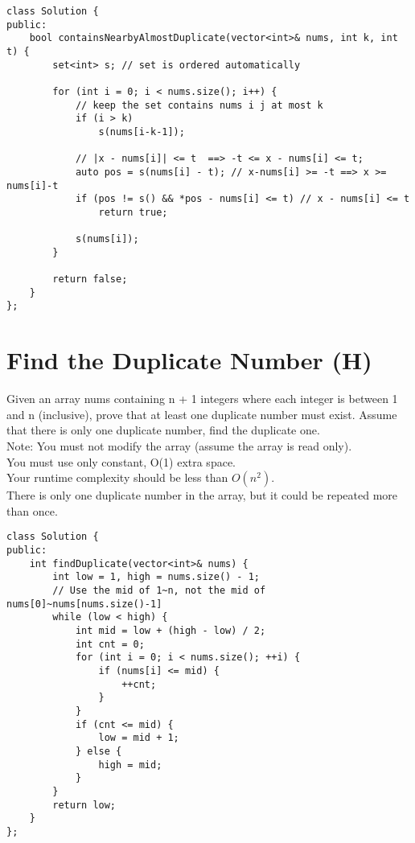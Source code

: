 \begin{lstlisting}
class Solution {
public:
    bool containsNearbyAlmostDuplicate(vector<int>& nums, int k, int t) {
        set<int> s; // set is ordered automatically 
        
        for (int i = 0; i < nums.size(); i++) {
            // keep the set contains nums i j at most k
            if (i > k) 
                s(nums[i-k-1]); 
            
            // |x - nums[i]| <= t  ==> -t <= x - nums[i] <= t;
            auto pos = s(nums[i] - t); // x-nums[i] >= -t ==> x >= nums[i]-t 
            if (pos != s() && *pos - nums[i] <= t) // x - nums[i] <= t
                return true;
            
            s(nums[i]);
        }
        
        return false;
    }
};
\end{lstlisting}


\section{Find the Duplicate Number (H)}
Given an array nums containing n + 1 integers where each integer is between 1 and n (inclusive), prove that at least one duplicate number must exist. Assume that there is only one duplicate number, find the duplicate one. \\

Note:
    You must not modify the array (assume the array is read only).\\
    You must use only constant, O(1) extra space.\\
    Your runtime complexity should be less than $O(n^2)$.\\
    There is only one duplicate number in the array, but it could be repeated more than once.\\

\begin{lstlisting}
class Solution {
public:
    int findDuplicate(vector<int>& nums) {
        int low = 1, high = nums.size() - 1;
        // Use the mid of 1~n, not the mid of nums[0]~nums[nums.size()-1]
        while (low < high) {
            int mid = low + (high - low) / 2; 
            int cnt = 0;
            for (int i = 0; i < nums.size(); ++i) {
                if (nums[i] <= mid) {
                    ++cnt;
                }
            }
            if (cnt <= mid) {
                low = mid + 1;
            } else {
                high = mid;
            }
        }
        return low;
    }
};
\end{lstlisting}



